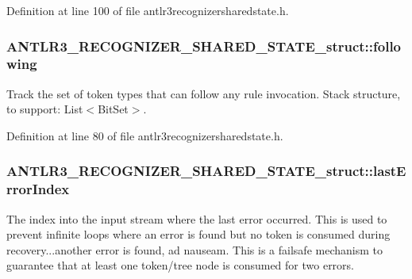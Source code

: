Definition at line 100 of file antlr3recognizersharedstate.\-h.

\hypertarget{struct_a_n_t_l_r3___r_e_c_o_g_n_i_z_e_r___s_h_a_r_e_d___s_t_a_t_e__struct_a8f1308bc7ecdd3035da5e98ebf68706a}{
\subsubsection[{following}]{ A\-N\-T\-L\-R3\-\_\-\-R\-E\-C\-O\-G\-N\-I\-Z\-E\-R\-\_\-\-S\-H\-A\-R\-E\-D\-\_\-\-S\-T\-A\-T\-E\-\_\-struct\-::following}}\label{struct_a_n_t_l_r3___r_e_c_o_g_n_i_z_e_r___s_h_a_r_e_d___s_t_a_t_e__struct_a8f1308bc7ecdd3035da5e98ebf68706a}
Track the set of token types that can follow any rule invocation. Stack structure, to support\-: List$<$\-Bit\-Set$>$. 

Definition at line 80 of file antlr3recognizersharedstate.\-h.

\hypertarget{struct_a_n_t_l_r3___r_e_c_o_g_n_i_z_e_r___s_h_a_r_e_d___s_t_a_t_e__struct_ae72492209456932a8735044e428a5b99}{
\subsubsection[{last\-Error\-Index}]{ A\-N\-T\-L\-R3\-\_\-\-R\-E\-C\-O\-G\-N\-I\-Z\-E\-R\-\_\-\-S\-H\-A\-R\-E\-D\-\_\-\-S\-T\-A\-T\-E\-\_\-struct\-::last\-Error\-Index}}\label{struct_a_n_t_l_r3___r_e_c_o_g_n_i_z_e_r___s_h_a_r_e_d___s_t_a_t_e__struct_ae72492209456932a8735044e428a5b99}
The index into the input stream where the last error occurred. This is used to prevent infinite loops where an error is found but no token is consumed during recovery...another error is found, ad nauseam. This is a failsafe mechanism to guarantee that at least one token/tree node is consumed for two errors. 

